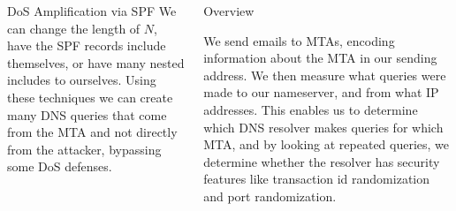 \documentclass[final]{beamer}
\newlength{\onecolwid}
\newlength{\twocolwid}
\begin{document}
\begin{frame}[t]
\begin{columns}[t]
\begin{column}{\twocolwid}
\begin{columns}[t,totalwidth=\twocolwid]
\begin{column}{\onecolwid}
\begin{block}{DoS Amplification via SPF}
We can change the length of $N$, have the SPF records include themselves, or have many nested includes to ourselves. Using these techniques we can create many DNS queries that come from the MTA and not directly from the attacker, bypassing some DoS defenses.
\end{block}



\end{column} %

\begin{column}{\onecolwid}\vspace{-.6in} %


\begin{block}{Overview}

We send emails to MTAs, encoding information about the MTA in our sending address.  We then measure what queries were made to our nameserver, and from what IP addresses.  This enables us to determine which DNS resolver makes queries for which MTA, and by looking at repeated queries, we determine whether the resolver has security features like transaction id randomization and port randomization.


\end{block}
\end{column}
\end{columns}
\end{column}
\end{columns}
\end{frame}
\end{document}
